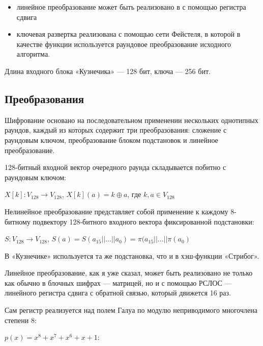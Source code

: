 \documentclass[a4paper,14pt]{report}
\begin{document}
\begin{itemize}
  \item линейное преобразование может быть реализовано в с помощью регистра сдвига
  \item ключевая развертка реализована с помощью сети Фейстеля, в которой в качестве функции используется раундовое преобразование исходного алгоритма.
  \end{itemize}
  
  Длина входного блока «Кузнечика» — 128 бит, ключа — 256 бит.
  
  
  \subsection{Преобразования}
  
  Шифрование основано на последовательном применении нескольких однотипных раундов, каждый из которых содержит три преобразования: сложение с раундовым ключом, преобразование блоком подстановок и линейное преобразование.

128-битный входной вектор очередного раунда складывается побитно с раундовым ключом:

$X[k]: V_{128} \rightarrow V_{128}$, $X[k](a) = k \oplus a$, где $k, a \in V_{128}$
  \hfill \break
  
  Нелинейное преобразование представляет собой применение к каждому 8-битному подвектору 128-битного входного вектора фиксированной подстановки:
  
  $S: V_{128} \rightarrow V_{128}$, $S(a) = S(a_{15}||...||a_{0}) = \pi(a_{15}||...||\pi(a_{0})$
    \hfill \break
    
В «Кузнечике» используется та же подстановка, что и в хэш-функции «Стрибог».
  
Линейное преобразование, как я уже сказал, может быть реализовано не только как обычно в блочных шифрах — матрицей, но и с помощью РСЛОС — линейного регистра сдвига с обратной связью, который движется 16 раз.

Сам регистр реализуется над полем Галуа по модулю неприводимого многочлена степени 8:

$p(x) = x^8 + x^7 + x^6 + x + 1:$

\begin{figure}[h]
\label{fig:image}
\end{figure}
\end{document}
